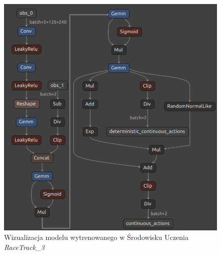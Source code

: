 \begin{figure}[h]
\begin{center}
\includegraphics[width=13.5cm]{resources/figures/model_visualization.png}
\caption{Wizualizacja modelu wytrenowanego w Środowisku Uczenia \textit{RaceTrack\_3}}
\label{ModelVisualization}
\end{center}
\end{figure}

